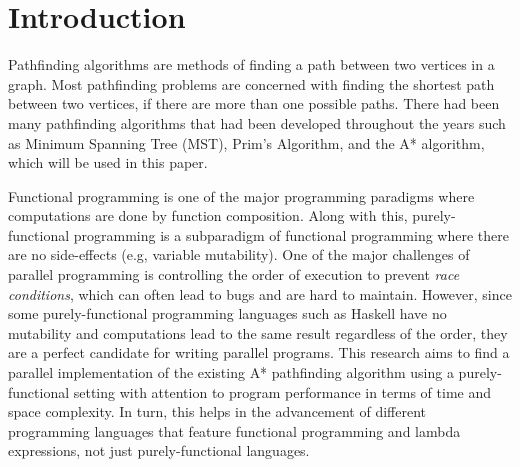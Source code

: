 \chapter{Introduction}

Pathfinding algorithms are methods of finding a path between two vertices in  
a graph. Most pathfinding problems are concerned with finding the shortest
path between two vertices, if there are more than one possible paths. There had 
been many pathfinding algorithms that had been developed throughout the years 
such as Minimum Spanning Tree (MST), Prim's Algorithm\cite{Prim1957}, and the A*
algorithm, which will be used in this paper.\cite{HartNilssonRaphael1968}

Functional programming is one of the major programming paradigms where computations 
are done by function composition. Along with this, purely-functional programming is 
a subparadigm of functional programming where there are no side-effects (e.g, variable mutability).
One of the major challenges of parallel programming is controlling the order of execution
to prevent \emph{race conditions}, which can often lead to bugs and are hard to maintain.
However, since some purely-functional programming languages such as Haskell\cite{HaskellSite}
have no mutability and computations lead to the same result regardless of the order, they 
are a perfect candidate for writing parallel programs.\cite{Hammond2011} 
This research aims to find a parallel implementation of the existing A* pathfinding algorithm
using a purely-functional setting with attention to program performance in terms of time and space 
complexity. \cite{ZaghloulAlJami2017, WeinstockHolladay}
In turn, this helps in the advancement of different programming languages that feature 
functional programming and lambda expressions, not just purely-functional languages.





